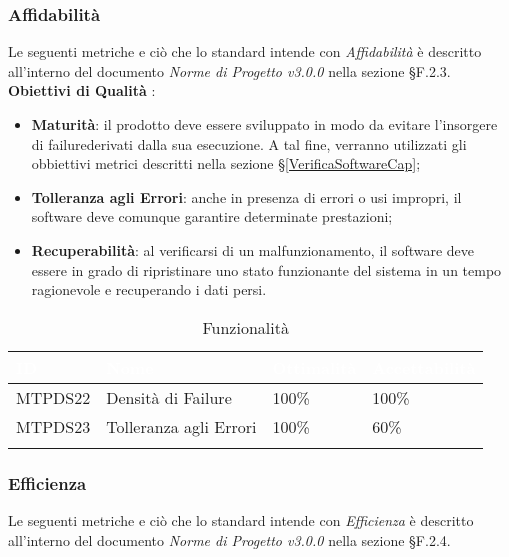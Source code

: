 \subsubsection{Affidabilità}

Le seguenti metriche e ciò che lo standard intende con \textit{Affidabilità} è descritto all'interno del documento \textit{Norme di Progetto v3.0.0} nella sezione §F.2.3. \\
\textbf{Obiettivi di Qualità} :

\begin{itemize}
	\item \textbf{Maturità}: il prodotto deve essere sviluppato in modo da evitare l'insorgere di failure\glossario derivati dalla sua esecuzione. A tal fine, verranno utilizzati gli obbiettivi metrici descritti nella sezione §\ref{VerificaSoftwareCap};
	\item \textbf{Tolleranza agli Errori}: anche in presenza di errori o usi impropri, il software deve comunque garantire determinate prestazioni;
	\item \textbf{Recuperabilità}: al verificarsi di un malfunzionamento, il software deve essere in grado di ripristinare uno stato funzionante del sistema in un tempo ragionevole e recuperando i dati persi.
\end{itemize}

\begin{longtable}{|C{.15\textwidth}|C{.24\textwidth}|C{.24\textwidth}|C{.24\textwidth}|}
\hline
{}\textbf{\textcolor{white}{ID}} & \textbf{\textcolor{white}{Nome}} & \textbf{\textcolor{white}{Ottimalità}} & \textbf{\textcolor{white}{Accettabilità}}\\
\hline
MTPDS22 & Densità di Failure & 100\% & 100\%\\
\hline
{}MTPDS23 & Tolleranza agli Errori & 100\% & 60\% \\ 
\hline
\caption{Funzionalità}
\label{Funzionalità}
\end{longtable}



\subsubsection{Efficienza}

Le seguenti metriche e ciò che lo standard intende con \textit{Efficienza} è descritto all'interno del documento \textit{Norme di Progetto v3.0.0} nella sezione §F.2.4. \\

